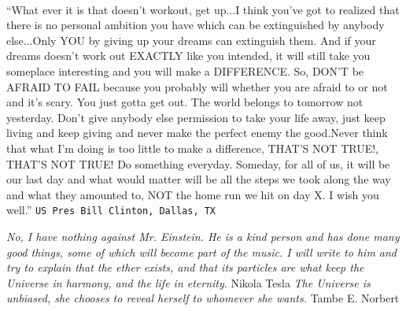\paragraph*{}
\textsf{“What ever it is that doesn’t workout, get up...I think you’ve got to realized that there is no personal ambition you have which can be extinguished by anybody else...Only YOU by giving up your dreams can extinguish them. And if your dreams doesn’t work out EXACTLY like you intended, it will still take you someplace interesting and you will make a DIFFERENCE. So, DON’T be AFRAID TO FAIL because you probably will whether you are afraid to or not and it's scary. You just gotta get out. 
The world belongs to tomorrow not yesterday. Don’t give anybody else permission to take your life away, just keep living and keep giving and never make the perfect enemy the good.Never think that what I’m doing is too little to make a difference, THAT'S NOT TRUE!, THAT'S NOT TRUE!  Do something everyday. Someday, for all of us, it will be our last day and what would matter will be all the steps we took along the way and what they amounted to, NOT the home run we hit on day X. I wish you well.”}
\newline
\texttt{US Pres  Bill Clinton, Dallas, TX}
\par

\textit{No, I have nothing against Mr. Einstein. He is a kind person and has done many good things, some of which will become part of the music. I will write to him and try to explain that the ether exists, and that its particles are what keep the Universe in harmony, and the life in eternity}. 
\newline
Nikola Tesla
\newline
\textit{The Universe is unbiased, she chooses to reveal herself to whomever she wants.}
\newline
Tambe E. Norbert

